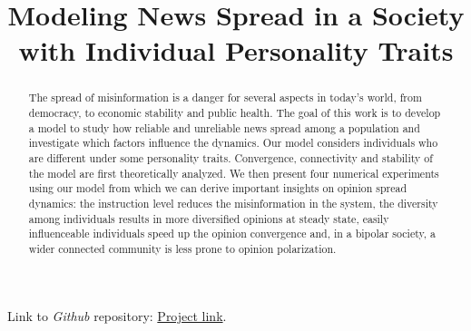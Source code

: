 \documentclass[10pt,conference]{IEEEtran}
\begin{document}
\title{Modeling News Spread in a Society with Individual Personality Traits\\}

\author{
\and
{}
\and
{}
}

\maketitle

\begin{abstract}
The spread of misinformation is a danger for several aspects in today's world, from democracy, to economic stability and public health. The goal of this work is to develop a model to study how reliable and unreliable news spread among a population and investigate which factors influence the dynamics. Our model considers individuals who are different under some personality traits. Convergence, connectivity and stability of the model are first theoretically analyzed. We then present four numerical experiments using our model from which we can derive important insights on opinion spread dynamics: the instruction level reduces the misinformation in the system, the diversity among individuals results in more diversified opinions at steady state, easily influenceable individuals speed up the opinion convergence and, in a bipolar society, a wider connected community is less prone to opinion polarization.
\end{abstract}
\vspace{0.2cm}
Link to \textit{Github} repository: \href{https://github.com/leonzug/ATICProjectNewsSpread.git}{Project link}.










%
\end{document}
